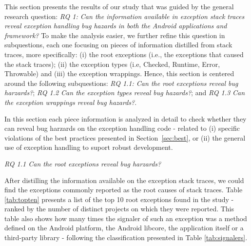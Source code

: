 This section presents the results of our study that was guided by the general research question:
 \emph{RQ 1: Can the information available in exception stack traces reveal exception handling 
bug hazards in both the Android applications and framework?}
To make the analysis easier, we further refine this question in subquestions, each one focusing on pieces of information
 distilled from stack traces, more specifically: (i) the root exceptions (i.e., the exceptions that caused the stack traces);
 (ii) the exception types (i.e, Checked, Runtime, Error, Throwable) and (iii) the exception wrappings. 
Hence, this section is centered around the following subquestions:  \emph{RQ 1.1: Can the root exceptions reveal bug harzards?}; 
 \emph{RQ 1.2 Can the exception types reveal bug hazards?}; and  \emph{RQ 1.3 Can the exception wrappings reveal bug hazards?}.

In this section each piece information is analyzed in detail to 
check whether they can reveal bug harzards on the exception handling code -
related to (i) specific violations of the best practices presented in Section~\ref{sec:best},
or (ii) the general use of exception handling to suport robust development.

 
\bigskip

\noindent\emph{RQ 1.1 Can the root exceptions reveal bug harzards?}

\bigskip

After distilling the information available on the exception stack traces, we could find 
the exceptions commonly reported as the root causes of stack traces.
Table \ref{tab:topten} presents a list of the top 10 root exceptions found in the study - 
 ranked by the number of distinct projects on which they were reported. 
This table also shows how many times the signaler of such an exception was a method defined on
the Android platform, the Android libcore, the application itself or a third-party library -
 following the classification presented in Table  \ref{tab:signalers}. 

